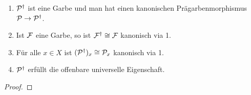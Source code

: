 \begin{satz}
    \renewcommand{\P}{\cal P}
    \begin{enumerate}
      \item $\P^\dagger$ ist eine Garbe und man hat einen kanonischen
        Prägarbenmorphismus $\P \to \P^\dagger$.
      \item Ist $\mathcal{F}$ eine Garbe, so ist $\mathcal{F}^\dagger \cong \mathcal{F}$ kanonisch
        via 1.
      \item Für alle $x\in X$ ist $(\P^\dagger)_x \cong \P_x$ kanonisch
        via 1.
      \item $\P^\dagger$ erfüllt die offenbare universelle Eigenschaft.     
    \end{enumerate}
\end{satz}
\begin{proof}
    \TODO
\end{proof}

